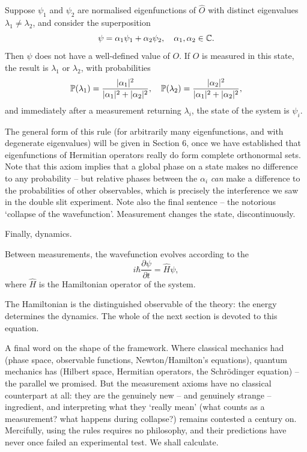 \documentclass[a4paper]{scrartcl}
\begin{document}
\begin{axiom}
    Suppose $\psi_1$ and $\psi_2$ are normalised eigenfunctions of $\hat{O}$ with distinct eigenvalues $\lambda_1 \neq \lambda_2$, and consider the superposition
    $$
    \psi = \alpha_1 \psi_1 + \alpha_2 \psi_2, \quad \alpha_1, \alpha_2 \in \mathbb{C}.
    $$
    Then $\psi$ does not have a well-defined value of $O$. If $O$ is measured in this state, the result is $\lambda_1$ or $\lambda_2$, with probabilities
    $$
    \mathbb{P}(\lambda_1) = \frac{\lvert\alpha_1\rvert^2}{\lvert\alpha_1\rvert^2 + \lvert\alpha_2\rvert^2}, \quad \mathbb{P}(\lambda_2) = \frac{\lvert\alpha_2\rvert^2}{\lvert\alpha_1\rvert^2 + \lvert\alpha_2\rvert^2},
    $$
    and immediately after a measurement returning $\lambda_i$, the state of the system is $\psi_i$.
\end{axiom}

The general form of this rule (for arbitrarily many eigenfunctions, and with degenerate eigenvalues) will be given in Section 6, once we have established that eigenfunctions of Hermitian operators really do form complete orthonormal sets. Note that this axiom implies that a global phase on a state makes no difference to any probability -- but relative phases between the $\alpha_i$ \emph{can} make a difference to the probabilities of other observables, which is precisely the interference we saw in the double slit experiment. Note also the final sentence -- the notorious `collapse of the wavefunction'. Measurement changes the state, discontinuously.

Finally, dynamics.

\begin{axiom}
    Between measurements, the wavefunction evolves according to the 
    $$
    i \hbar \frac{\partial \psi}{\partial t} = \hat{H} \psi,
    $$
    where $\hat{H}$ is the Hamiltonian operator of the system.
\end{axiom}

The Hamiltonian is the distinguished observable of the theory: the energy determines the dynamics. The whole of the next section is devoted to this equation.

A final word on the shape of the framework. Where classical mechanics had (phase space, observable functions, Newton/Hamilton's equations), quantum mechanics has (Hilbert space, Hermitian operators, the Schr\"odinger equation) -- the parallel we promised. But the measurement axioms have no classical counterpart at all: they are the genuinely new -- and genuinely strange -- ingredient, and interpreting what they `really mean' (what counts as a measurement? what happens during collapse?) remains contested a century on. Mercifully, using the rules requires no philosophy, and their predictions have never once failed an experimental test. We shall calculate.
\end{document}
